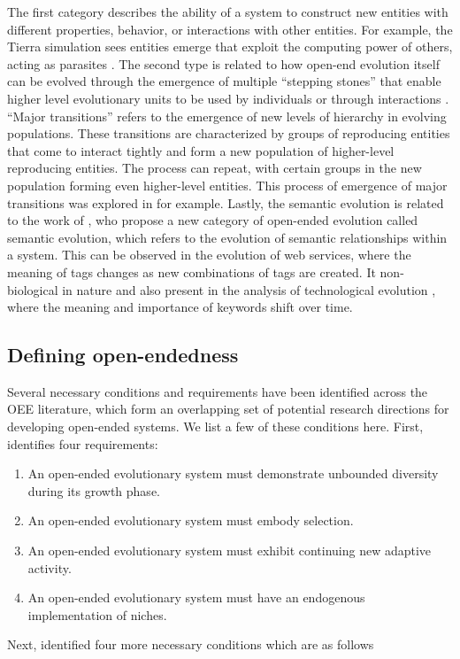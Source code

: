 The first category describes the ability of a system to construct new entities
with different properties, behavior, or interactions with other entities. For
example, the Tierra simulation sees entities emerge that exploit the computing
power of others, acting as parasites \parencite{srayApproachSynthesisLife1991}.
The second type is related to how open-end evolution itself can be evolved
through the emergence of multiple ``stepping stones'' that enable higher level
evolutionary units to be used by individuals or through interactions
\parencite{patteeEvolvedOpenEndednessNot2019}. ``Major transitions'' refers to
the emergence of new levels of hierarchy in evolving populations. These
transitions are characterized by groups of reproducing entities that come to
interact tightly and form a new population of higher-level reproducing entities.
The process can repeat, with certain groups in the new population forming even
higher-level entities. This process of emergence of major transitions was
explored in \parencite{sayamaCardinalityLeapOpenEnded2019,
  morenoOpenEndedFraternalTransitions2019} for example. Lastly, the semantic
evolution is related to the work of
\textcite{ikegamiOpenEndedEvolutionMechanism2019}, who propose a new category of
open-ended evolution called semantic evolution, which refers to the evolution of
semantic relationships within a system. This can be observed in the evolution of
web services, where the meaning of tags changes as new combinations of tags are
created. It non-biological in nature and also present in the analysis of
technological evolution \parencite{bedauOpenEndedTechnologicalInnovation2019},
where the meaning and importance of keywords shift over time.

\subsection{Defining open-endedness}

Several necessary conditions and requirements have been identified across the
\ac{OEE} literature, which form an overlapping set of potential research
directions for developing open-ended systems. We list a few of these conditions
here. First, \textcite{maleyFourStepsOpenended1999} identifies four requirements:

\begin{enumerate}
  \item An open-ended evolutionary system must demonstrate unbounded diversity
        during its growth phase.
  \item An open-ended evolutionary system must embody selection.
  \item An open-ended evolutionary system must exhibit continuing new adaptive
        activity.
  \item An open-ended evolutionary system must have an endogenous implementation
        of niches.
\end{enumerate}
Next, \textcite{sorosIdentifyingNecessaryConditions2014} identified four more necessary
conditions which are as follows

